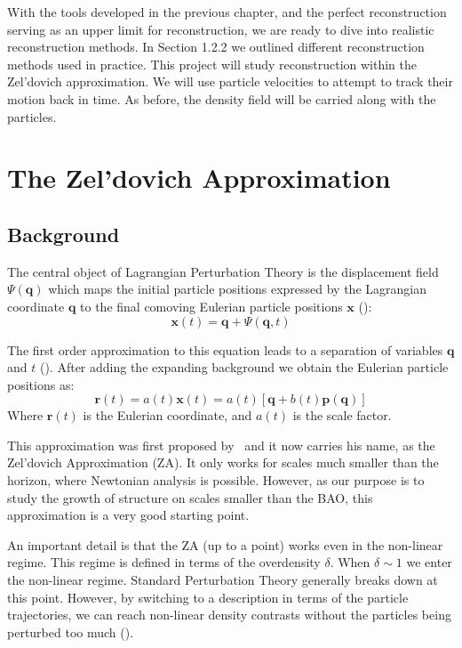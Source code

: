 
With the tools developed in the previous chapter, and the perfect reconstruction serving as an upper limit for reconstruction, we are ready to dive into realistic reconstruction methods. In Section 1.2.2 we outlined different reconstruction methods used in practice. This project will study reconstruction within the Zel'dovich approximation. We will use particle velocities to attempt to track their motion back in time. As before, the density field will be carried along with the particles.

\section{The Zel'dovich Approximation}

\subsection{Background}

The central object of Lagrangian Perturbation Theory is the displacement field $\Psi(\textbf{q})$ which maps the initial particle positions expressed by the Lagrangian coordinate $\textbf{q}$ to the final comoving Eulerian particle positions $\textbf{x}$ (\cite{Bernardeau_PT}):
\begin{equation}
     \textbf{x}(t) = \textbf{q} + \Psi(\textbf{q}, t)
\end{equation}

The first order approximation to this equation leads to a separation of variables $\textbf{q}$ and $t$ (\cite{1993sfu..book.....P}). After adding the expanding background we obtain the Eulerian particle positions as:
\begin{equation}
    \textbf{r}(t) = a(t) \textbf{x}(t) = a(t) [\textbf{q} + b(t) \textbf{p}(\textbf{q})]
    \label{eq:2.2}
\end{equation}
Where $\textbf{r}(t)$ is the Eulerian coordinate, and $a(t)$ is the scale factor.

This approximation was first proposed by~\cite{1970A&A.....5...84Z} and it now carries his name, as the Zel'dovich Approximation (ZA). It only works for scales much smaller than the horizon, where Newtonian analysis is possible. However, as our purpose is to study the growth of structure on scales smaller than the BAO, this approximation is a very good starting point. 

An important detail is that the ZA (up to a point) works even in the non-linear regime. This regime is defined in terms of the overdensity $\delta$. When $\delta \sim 1$ we enter the non-linear regime. Standard Perturbation Theory generally breaks down at this point. However, by switching to a description in terms of the particle trajectories, we can reach non-linear density contrasts without the particles being perturbed too much (\cite{1993sfu..book.....P}).

